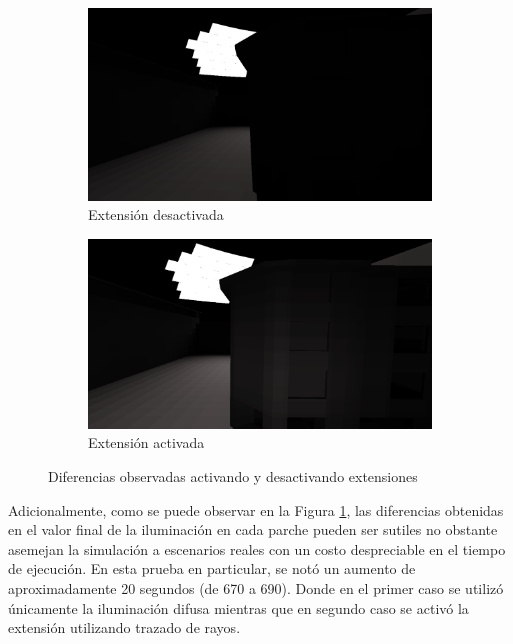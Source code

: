 \begin{figure}[htbp!]
	\centering
	\begin{subfigure}{0.47\textwidth}
		\includegraphics[width=1\linewidth]{assets/streete}
		\caption{Extensión desactivada}
	\end{subfigure}
	\begin{subfigure}{0.47\textwidth}
		\includegraphics[width=1\linewidth]{assets/streets}
		\caption{Extensión activada}
	\end{subfigure}
	\caption{Diferencias observadas activando y desactivando extensiones}
	\label{img:difspecstreet}
\end{figure}

Adicionalmente, como se puede observar en la Figura \ref{img:difspecstreet}, las diferencias obtenidas en el valor final de la iluminación en cada parche pueden ser sutiles no obstante asemejan la simulación a escenarios reales con un costo despreciable en el tiempo de ejecución. En esta prueba en particular, se notó un aumento de aproximadamente 20 segundos (de 670 a 690). Donde en el primer caso se utilizó únicamente la iluminación difusa mientras que en segundo caso se activó la extensión utilizando trazado de rayos.

